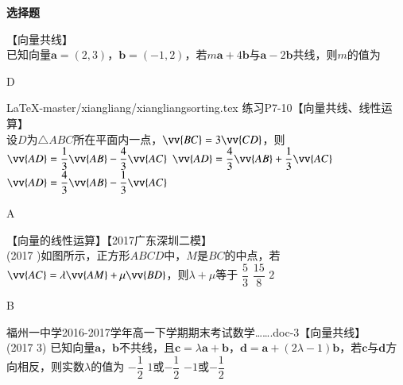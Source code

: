 \begin{exercise}{\bf 选择题}
    \item 【向量共线】\\
      已知向量$\bm a=(2,3)$，$\bm b=(-1,2)$，若$m\bm a+4\bm b$与$\bm a-2\bm b$共线，则$m$的值为\xz
      \begin{answer}
        D
      \end{answer}
    \item LaTeX-master/xiangliang/xiangliangsorting.tex 练习P7-10【向量共线、线性运算】\\
      设$ D $为$\triangle ABC$所在平面内一点，$ \vv{BC}=3\vv{CD} $，则\xz
        {$ \vv{AD}=\dfrac{1}{3}\vv{AB}-\dfrac{4}{3}\vv{AC}$}
        {$ \vv{AD}=\dfrac{4}{3}\vv{AB}+\dfrac{1}{3}\vv{AC}$}
        {$ \vv{AD}=\dfrac{4}{3}\vv{AB}-\dfrac{1}{3}\vv{AC}$}
      \begin{answer}
        A
      \end{answer}
    \item 【向量的线性运算】【2017广东深圳二模】\\
      (2017 )如图所示，正方形$ABCD$中，$M$是$BC$的中点，若$\vv{AC}=\lambda\vv{AM}+\mu\vv{BD}$，则$\lambda+\mu$等于\xz
       {$\dfrac{5}3$}
       {$\dfrac{15}8$}
       {$2$}
      \begin{center}
      \end{center}
      \begin{answer}
        B
      \end{answer}
    \item 福州一中学2016-2017学年高一下学期期末考试数学…….doc-3【向量共线】\\
      (2017  3)
      已知向量$\bm a$，$\bm b$不共线，且$\bm c=\lambda\bm a+\bm b$，$\bm d=\bm a+(2\lambda-1)\bm b$，若$\bm c$与$\bm d$方向相反，则实数$\lambda$的值为\xz
       {$-\dfrac12$}
       {$1$或$-\dfrac12$}
       {$-1$或$-\dfrac12$}

\end{exercise}
